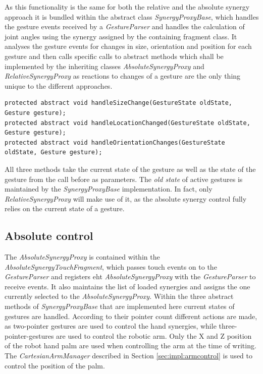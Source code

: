 As this functionality is the same for both the relative and the absolute synergy approach it is bundled within the abstract class \textit{SynergyProxyBase}, which handles the gesture events received by a \textit{GestureParser} and handles the calculation of joint angles using the synergy assigned by the containing fragment class. It analyses the gesture events for changes in size, orientation and position for each gesture and then calls specific calls to abstract methods which shall be implemented by the inheriting classes \textit{AbsoluteSynergyProxy} and \textit{RelativeSynergyProxy} as reactions to changes of a gesture are the only thing unique to the different approaches.
\begin{lstlisting}
protected abstract void handleSizeChange(GestureState oldState, Gesture gesture);
protected abstract void handleLocationChanged(GestureState oldState, Gesture gesture);
protected abstract void handleOrientationChanges(GestureState oldState, Gesture gesture);
\end{lstlisting}
All three methods take the current state of the gesture as well as the state of the gesture from the call before as parameters. The \textit{old state} of active gestures is maintained by the \textit{SynergyProxyBase} implementation. In fact, only \textit{RelativeSynergyProxy} will make use of it, as the absolute synergy control fully relies on the current state of a gesture.

\subsection{Absolute control}
\label{sec:impl:syn:absc}
The \textit{AbsoluteSynergyProxy} is contained within the \textit{AbsoluteSynergyTouchFragment}, which passes touch events on to the \textit{GestureParser} and registers eht \textit{AbsoluteSynergyProxy} with the \textit{GestureParser} to receive events. It also maintains the list of loaded synergies and assigns the one currently selected to the \textit{AbsoluteSynergyProxy}. Within the three abstract methods of \textit{SynergyProxyBase} that are implemented here current states of gestures are handled. According to their pointer count different actions are made, as two-pointer gestures are used to control the hand synergies, while three-pointer-gestures are used to control the robotic arm. Only the X and Z position of the robot hand palm are used when controlling the arm at the time of writing. The \textit{CartesianArmManager} described in Section \ref{sec:impl:armcontrol} is used to control the position of the palm. 

